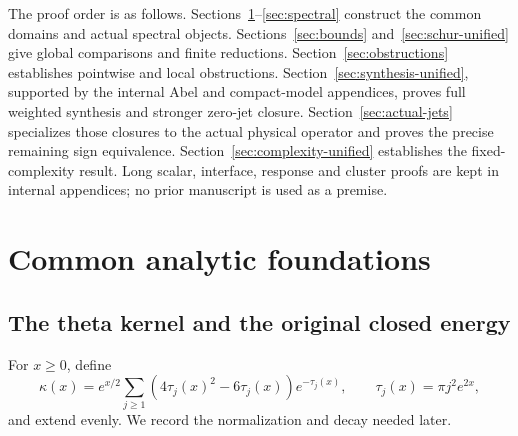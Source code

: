 \documentclass[11pt,a4paper]{article}
\numberwithin{equation}{section}
\theoremstyle{definition}\newtheorem{definition}[theorem]{Definition}
\theoremstyle{remark}\newtheorem{remark}[theorem]{Remark}
\begin{document}
The proof order is as follows. Sections~\ref{sec:foundations}--\ref{sec:spectral} construct the common domains and actual spectral objects. Sections~\ref{sec:bounds} and~\ref{sec:schur-unified} give global comparisons and finite reductions. Section~\ref{sec:obstructions} establishes pointwise and local obstructions. Section~\ref{sec:synthesis-unified}, supported by the internal Abel and compact-model appendices, proves full weighted synthesis and stronger zero-jet closure. Section~\ref{sec:actual-jets} specializes those closures to the actual physical operator and proves the precise remaining sign equivalence. Section~\ref{sec:complexity-unified} establishes the fixed-complexity result. Long scalar, interface, response and cluster proofs are kept in internal appendices; no prior manuscript is used as a premise.

\section{Common analytic foundations}\label{sec:foundations}


\subsection{The theta kernel and the original closed energy}\label{a:sec:energy}

For $x\ge0$, define
\begin{equation}\label{a:eq:kappa}
 \kappa(x)=e^{x/2}\sum_{j\ge1}(4\tau_j(x)^2-6\tau_j(x))e^{-\tau_j(x)},
 \qquad \tau_j(x)=\pi j^2e^{2x},
\end{equation}
and extend evenly. We record the normalization and decay needed later.
\end{document}
